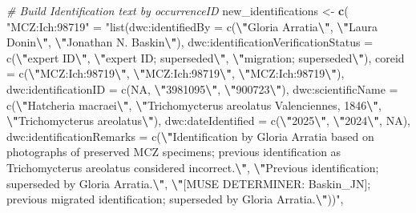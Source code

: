 \documentclass[sn-apa,pdflatex]{sn-jnl}
\newenvironment{Shaded}{\begin{snugshade}}{\end{snugshade}}
\newcommand{\CommentTok}[1]{\textcolor[rgb]{0.56,0.35,0.01}{\textit{#1}}}
\newcommand{\FunctionTok}[1]{\textcolor[rgb]{0.13,0.29,0.53}{\textbf{#1}}}
\newcommand{\NormalTok}[1]{#1}
\newcommand{\OtherTok}[1]{\textcolor[rgb]{0.56,0.35,0.01}{#1}}
\newcommand{\SpecialCharTok}[1]{\textcolor[rgb]{0.81,0.36,0.00}{\textbf{#1}}}
\newcommand{\StringTok}[1]{\textcolor[rgb]{0.31,0.60,0.02}{#1}}
\begin{document}
\begin{Shaded}
\begin{Highlighting}[]
\CommentTok{\# Build Identification text by occurrenceID}
\NormalTok{new\_identifications }\OtherTok{\textless{}{-}} \FunctionTok{c}\NormalTok{(}
  \StringTok{"MCZ:Ich:98719"} \OtherTok{=}
    \StringTok{"list(\textasciigrave{}dwc:identifiedBy\textasciigrave{} = c(}\SpecialCharTok{\textbackslash{}"}\StringTok{Gloria Arratia}\SpecialCharTok{\textbackslash{}"}\StringTok{, }\SpecialCharTok{\textbackslash{}"}\StringTok{Laura Donin}\SpecialCharTok{\textbackslash{}"}\StringTok{, }\SpecialCharTok{\textbackslash{}"}\StringTok{Jonathan N. Baskin}\SpecialCharTok{\textbackslash{}"}\StringTok{), \textasciigrave{}dwc:identificationVerificationStatus\textasciigrave{} = c(}\SpecialCharTok{\textbackslash{}"}\StringTok{expert ID}\SpecialCharTok{\textbackslash{}"}\StringTok{, }\SpecialCharTok{\textbackslash{}"}\StringTok{expert ID; superseded}\SpecialCharTok{\textbackslash{}"}\StringTok{, }\SpecialCharTok{\textbackslash{}"}\StringTok{migration; superseded}\SpecialCharTok{\textbackslash{}"}\StringTok{), coreid = c(}\SpecialCharTok{\textbackslash{}"}\StringTok{MCZ:Ich:98719}\SpecialCharTok{\textbackslash{}"}\StringTok{, }\SpecialCharTok{\textbackslash{}"}\StringTok{MCZ:Ich:98719}\SpecialCharTok{\textbackslash{}"}\StringTok{, }\SpecialCharTok{\textbackslash{}"}\StringTok{MCZ:Ich:98719}\SpecialCharTok{\textbackslash{}"}\StringTok{), \textasciigrave{}dwc:identificationID\textasciigrave{} = c(NA, }\SpecialCharTok{\textbackslash{}"}\StringTok{3981095}\SpecialCharTok{\textbackslash{}"}\StringTok{, }\SpecialCharTok{\textbackslash{}"}\StringTok{900723}\SpecialCharTok{\textbackslash{}"}\StringTok{), \textasciigrave{}dwc:scientificName\textasciigrave{} = c(}\SpecialCharTok{\textbackslash{}"}\StringTok{Hatcheria macraei}\SpecialCharTok{\textbackslash{}"}\StringTok{, }\SpecialCharTok{\textbackslash{}"}\StringTok{Trichomycterus areolatus Valenciennes, 1846}\SpecialCharTok{\textbackslash{}"}\StringTok{, }\SpecialCharTok{\textbackslash{}"}\StringTok{Trichomycterus areolatus}\SpecialCharTok{\textbackslash{}"}\StringTok{), \textasciigrave{}dwc:dateIdentified\textasciigrave{} = c(}\SpecialCharTok{\textbackslash{}"}\StringTok{2025}\SpecialCharTok{\textbackslash{}"}\StringTok{, }\SpecialCharTok{\textbackslash{}"}\StringTok{2024}\SpecialCharTok{\textbackslash{}"}\StringTok{, NA), \textasciigrave{}dwc:identificationRemarks\textasciigrave{} = c(}\SpecialCharTok{\textbackslash{}"}\StringTok{Identification by Gloria Arratia based on photographs of preserved MCZ specimens; previous identification as Trichomycterus areolatus considered incorrect.}\SpecialCharTok{\textbackslash{}"}\StringTok{, }\SpecialCharTok{\textbackslash{}"}\StringTok{Previous identification; superseded by Gloria Arratia.}\SpecialCharTok{\textbackslash{}"}\StringTok{, }\SpecialCharTok{\textbackslash{}"}\StringTok{[MUSE DETERMINER: Baskin\_JN]; previous migrated identification; superseded by Gloria Arratia.}\SpecialCharTok{\textbackslash{}"}\StringTok{))"}\NormalTok{,}


\end{Highlighting}
\end{Shaded}
\end{document}
